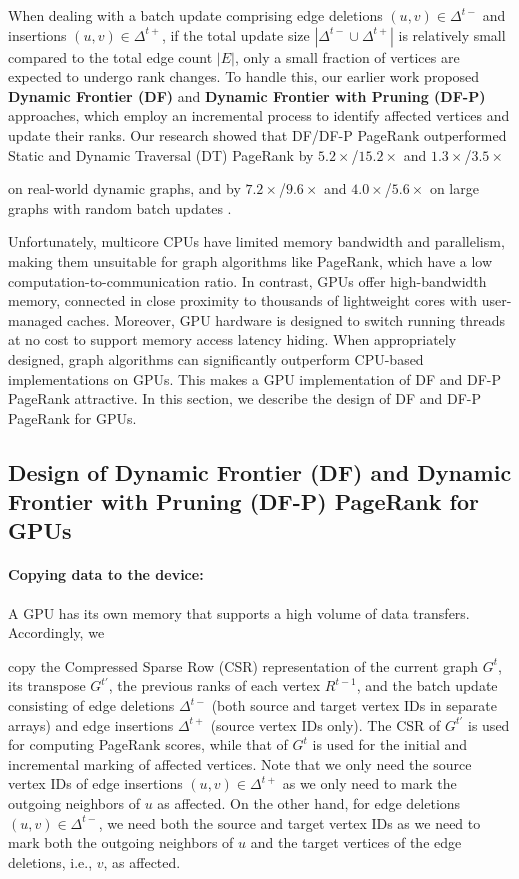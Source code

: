 When dealing with a batch update comprising edge deletions $(u, v) \in \Delta^{t-}$ and insertions $(u, v) \in \Delta^{t+}$, if the total update size $|\Delta^{t-} \cup \Delta^{t+}|$ is relatively small compared to the total edge count $|E|$, only a small fraction of vertices are expected to undergo rank changes. To handle this, our earlier work proposed \textbf{Dynamic Frontier (DF)} and \textbf{Dynamic Frontier with Pruning (DF-P)} approaches, which employ an incremental process to identify affected vertices and update their ranks. Our research showed that DF/DF-P PageRank outperformed Static and Dynamic Traversal (DT) PageRank by $5.2\times$/$15.2\times$ and $1.3\times$/$3.5\times$ on real-world dynamic graphs, and by $7.2\times$/$9.6\times$ and $4.0\times$/$5.6\times$ on large graphs with random batch updates \cite{sahu2024df}.

Unfortunately, multicore CPUs have limited memory bandwidth and parallelism, making them unsuitable for graph algorithms like PageRank, which have a low computation-to-communication ratio. In contrast, GPUs offer high-bandwidth memory, connected in close proximity to thousands of lightweight cores with user-managed caches. Moreover, GPU hardware is designed to switch running threads at no cost to support memory access latency hiding. When appropriately designed, graph algorithms can significantly outperform CPU-based implementations on GPUs. This makes a GPU implementation of DF and DF-P PageRank attractive. In this section, we describe the design of DF and DF-P PageRank for GPUs.



\subsection{Design of Dynamic Frontier (DF) and Dynamic Frontier with Pruning (DF-P) PageRank for GPUs}
\label{sec:frontier}

\paragraph{Copying data to the device:}

A GPU has its own memory that supports a high volume of data transfers. Accordingly, we copy the Compressed Sparse Row (CSR) representation of the current graph $G^t$, its transpose $G^{t'}$, the previous ranks of each vertex $R^{t-1}$, and the batch update consisting of edge deletions $\Delta^{t-}$ (both source and target vertex IDs in separate arrays) and edge insertions $\Delta^{t+}$ (source vertex IDs only). The CSR of $G^{t'}$ is used for computing PageRank scores, while that of $G^t$ is used for the initial and incremental marking of affected vertices. Note that we only need the source vertex IDs of edge insertions $(u, v) \in \Delta^{t+}$ as we only need to mark the outgoing neighbors of $u$ as affected. On the other hand, for edge deletions $(u, v) \in \Delta^{t-}$, we need both the source and target vertex IDs as we need to mark both the outgoing neighbors of $u$ and the target vertices of the edge deletions, i.e., $v$, as affected.

